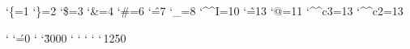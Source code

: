 
\catcode`\{=1
\catcode`\}=2
\catcode`\$=3
\catcode`\&=4
\catcode`\#=6
\catcode`\^=7
\catcode`\_=8
\catcode`\^^I=10
\catcode`\~=13
\catcode`@=11
\catcode`\^^c3=13
\catcode`\^^c2=13

\sfcode` \sfcode`\'=0 \sfcode` \sfcode`\.3000 \sfcode`
\sfcode` \sfcode` \sfcode` \sfcode`\,1250

